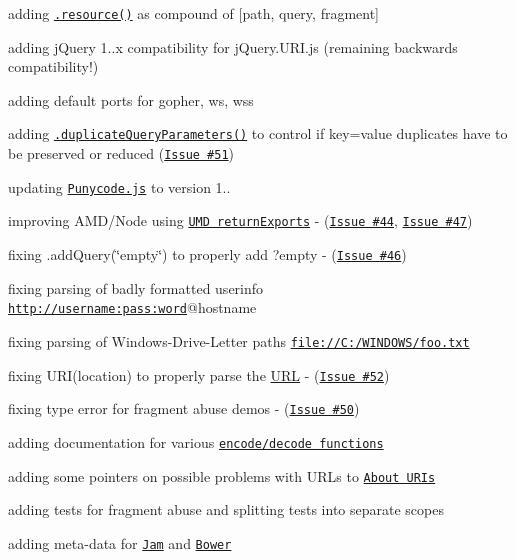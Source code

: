 \begin{DoxyItemize}
\item adding \href{http://medialize.github.io/URI.js/docs.html#accessors-resource}{\tt {\ttfamily .resource()}} as compound of \mbox{[}path, query, fragment\mbox{]}
\item adding j\+Query 1..\+x compatibility for j\+Query.\+U\+R\+I.\+js (remaining backwards compatibility!)
\item adding default ports for gopher, ws, wss
\item adding \href{http://medialize.github.io/URI.js/docs.html#setting-duplicateQueryParameters}{\tt {\ttfamily .duplicate\+Query\+Parameters()}} to control if {\ttfamily key=value} duplicates have to be preserved or reduced (\href{https://github.com/medialize/URI.js/issues/51}{\tt Issue \#51})
\item updating \href{https://github.com/bestiejs/punycode.js/}{\tt Punycode.\+js} to version 1..
\item improving A\+M\+D/\+Node using \href{https://github.com/umdjs/umd/blob/master/returnExports.js}{\tt U\+MD return\+Exports} -\/ (\href{https://github.com/medialize/URI.js/issues/44}{\tt Issue \#44}, \href{https://github.com/medialize/URI.js/issues/47}{\tt Issue \#47})
\item fixing {\ttfamily .add\+Query(\char`\"{}empty\char`\"{})} to properly add {\ttfamily ?empty} -\/ (\href{https://github.com/medialize/URI.js/issues/46}{\tt Issue \#46})
\item fixing parsing of badly formatted userinfo {\ttfamily \href{http://username:pass:word}{\tt http\+://username\+:pass\+:word}@hostname}
\item fixing parsing of Windows-\/\+Drive-\/\+Letter paths {\ttfamily \href{file://C:/WINDOWS/foo.txt}{\tt file\+://\+C\+:/\+W\+I\+N\+D\+O\+W\+S/foo.\+txt}}
\item fixing {\ttfamily U\+R\+I(location)} to properly parse the \mbox{\hyperlink{namespace_u_r_l}{U\+RL}} -\/ (\href{https://github.com/medialize/URI.js/issues/52}{\tt Issue \#52})
\item fixing type error for fragment abuse demos -\/ (\href{https://github.com/medialize/URI.js/issues/50}{\tt Issue \#50})
\item adding documentation for various \href{http://medialize.github.io/URI.js/docs.html#encoding-decoding}{\tt encode/decode functions}
\item adding some pointers on possible problems with U\+R\+Ls to \href{http://medialize.github.io/URI.js/about-uris.html}{\tt About U\+R\+Is}
\item adding tests for fragment abuse and splitting tests into separate scopes
\item adding meta-\/data for \href{http://jamjs.org/}{\tt Jam} and \href{http://twitter.github.com/bower/}{\tt Bower}
\end{DoxyItemize}

